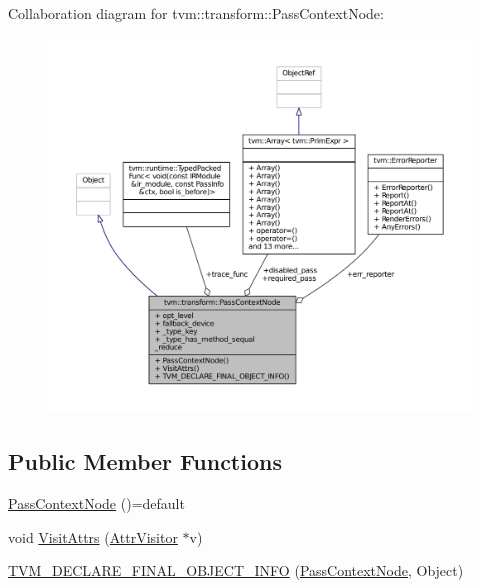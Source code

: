 Collaboration diagram for tvm\+:\+:transform\+:\+:Pass\+Context\+Node\+:
\nopagebreak
\begin{figure}[H]
\begin{center}
\leavevmode
\includegraphics[width=350pt]{classtvm_1_1transform_1_1PassContextNode__coll__graph}
\end{center}
\end{figure}
\subsection*{Public Member Functions}
\begin{DoxyCompactItemize}
\item 
\hyperlink{classtvm_1_1transform_1_1PassContextNode_aa91df8069b6573e72305ab57e9bc620f}{Pass\+Context\+Node} ()=default
\item 
void \hyperlink{classtvm_1_1transform_1_1PassContextNode_acc5e97af0ff79af8ab2d6745745e8c63}{Visit\+Attrs} (\hyperlink{classtvm_1_1AttrVisitor}{Attr\+Visitor} $\ast$v)
\item 
\hyperlink{classtvm_1_1transform_1_1PassContextNode_a613725ab055b022ae84d7cabb755533d}{T\+V\+M\+\_\+\+D\+E\+C\+L\+A\+R\+E\+\_\+\+F\+I\+N\+A\+L\+\_\+\+O\+B\+J\+E\+C\+T\+\_\+\+I\+N\+FO} (\hyperlink{classtvm_1_1transform_1_1PassContextNode}{Pass\+Context\+Node}, Object)
\end{DoxyCompactItemize}
